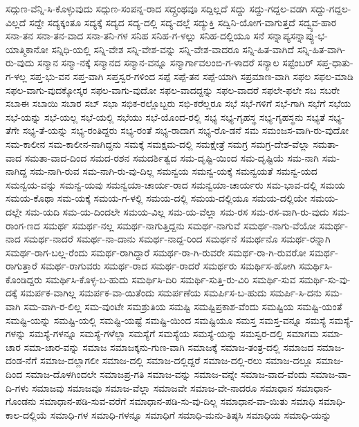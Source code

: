 ಸದ್ಗುಣ-ವೆನ್ನಿ-ಸಿ-ಕೊಳ್ಳುವುದು
ಸದ್ಗುಣ-ಸಂಪನ್ನ-ರಾದ
ಸದ್ಗ್ರಂಥವೂ
ಸದ್ದಿಲ್ಲದೆ
ಸದ್ದು
ಸದ್ದು-ಗದ್ದಲ-ವಡಗಿ
ಸದ್ದು-ಗದ್ದಲ-ವಿಲ್ಲದೆ
ಸದ್ದೇ
ಸದ್ಯಕ್ಕಂತೂ
ಸದ್ಯಕ್ಕೆ
ಸದ್ಯದ
ಸದ್ಯ-ದಲ್ಲಿ
ಸದ್ಯ-ದಲ್ಲೆ
ಸದ್ಯುಕ್ತಿ
ಸದ್ವಿನಿ-ಯೋಗ-ವಾಗುತ್ತದೆ
ಸದ್ವ್ಯವ-ಹಾರ
ಸನಾ-ತನ
ಸನಾ-ತನ-ವಾದ
ಸನಾ-ತನಿ-ಗಳ
ಸನಿಹ
ಸನಿಹ-ಗ-ಳಲ್ಲು
ಸನಿಹ-ದಲ್ಲಿಯೂ
ಸನೆ
ಸನ್ನಾಪ್ಯಸನ್ನಾಪ್ಯು-ಭ-ಯಾತ್ಮಿಕಾನೋ
ಸನ್ನಿಧಿ-ಯಲ್ಲಿ
ಸನ್ನಿ-ವೇಶ
ಸನ್ನಿ-ವೇಶ-ವನ್ನು
ಸನ್ನಿ-ವೇಶ-ವಾದರೂ
ಸನ್ನಿ-ಹಿತ-ವಾಗಿದೆ
ಸನ್ನಿ-ಹಿತ-ವಾಗಿ-ರು-ವುದು
ಸನ್ಮಾನ
ಸನ್ಮಾ-ನಕ್ಕೆ
ಸನ್ಮಾನದ
ಸನ್ಮಾನ-ವನ್ನೂ
ಸನ್ಮಾರ್ಗಾವಲಂಬಿ-ಗ-ಳಾದರೆ
ಸನ್ಯಾಲ
ಸಪ್ಟೆಂಬರ್
ಸಪ್ತ-ಧಾತು-ಗ-ಳಲ್ಲ
ಸಪ್ತ-ಭು-ವನ
ಸಪ್ತ-ವಾಗಿ
ಸಪ್ತಸ್ವರ-ಗಳಿಂದ
ಸಪ್ಪೆ
ಸಪ್ಪೆ-ತನ
ಸಪ್ಪೆ-ಯಾಗಿ
ಸಪ್ರಮಾಣ-ವಾಗಿ
ಸಫಲ
ಸಫಲ-ಮಾಡಿ
ಸಫಲ-ವಾಗು-ವುದಕ್ಕೋಸ್ಕರ
ಸಫಲ-ವಾಗು-ವುದೋ
ಸಫಲ-ವಾದದ್ದನ್ನು
ಸಫಲ-ವಾದರೆ
ಸಫಲೇ-ಫಲೇ
ಸಬ
ಸಬರೇ
ಸಬಾಈ
ಸಬಾಯಿ
ಸಬಾರ
ಸಬ್
ಸಭಾ
ಸಭಿಕ-ರಲ್ಲೊಬ್ಬರು
ಸಭಿ-ಕರೆಲ್ಲರೂ
ಸಭೆ
ಸಭೆ-ಗಳಿಗೆ
ಸಭೆ-ಗಾಗಿ
ಸಭೆಗೆ
ಸಭೆಯ
ಸಭೆ-ಯನ್ನು
ಸಭೆ-ಯಲ್ಲ
ಸಭೆ-ಯಲ್ಲಿ
ಸಭೆಯು
ಸಭೆ-ಯೊಂದ-ರಲ್ಲಿ
ಸಭ್ಯ
ಸಭ್ಯ-ಗೃಹಸ್ಥ
ಸಭ್ಯ-ಗೃಹಸ್ಥನು
ಸಭ್ಯತೆ
ಸಭ್ಯ-ತೆಗೇ
ಸಭ್ಯ-ತೆ-ಯನ್ನು
ಸಭ್ಯ-ರಂತಿದ್ದರು
ಸಭ್ಯ-ರಂತೆ
ಸಭ್ಯ-ರಾದಾಗ
ಸಭ್ಯ-ರೊ-ಡನೆ
ಸಮ
ಸಮಂಜಸ-ವಾಗಿ-ರು-ವುದೋ
ಸಮ-ಕಾಲೀನ
ಸಮ-ಕಾಲೀನ-ನಾಗಿದ್ದನು
ಸಮಕ್ಕೆ
ಸಮಕ್ಷಮ-ದಲ್ಲಿ
ಸಮಕ್ಷೇತ್ರೆ
ಸಮಗ್ರ
ಸಮಗ್ರ-ದೇಶ-ವೆಲ್ಲಾ
ಸಮತಾ-ವಾದ
ಸಮತಾ-ವಾದ-ದಿಂದ
ಸಮದ-ರಶನ
ಸಮದರ್ಶಿತ್ವದ
ಸಮ-ದೃಷ್ಟಿ-ಯಿಂದ
ಸಮ-ದೃಷ್ಟಿಯೆ
ಸಮ-ನಾಗಿ
ಸಮ-ನಾಗಿದ್ದ
ಸಮ-ನಾಗಿ-ರುವ
ಸಮ-ನಾಗಿ-ರು-ವು-ದಿಲ್ಲ
ಸಮನ್ವಯ
ಸಮನ್ವ-ಯಕ್ಕೆ
ಸಮನ್ವಯತೆ
ಸಮನ್ವ-ಯದ
ಸಮನ್ವಯ-ವನ್ನು
ಸಮನ್ವ-ಯವು
ಸಮನ್ವಯಾ-ಚಾರ್ಯ-ರಾದ
ಸಮನ್ವಯಾ-ಚಾರ್ಯರು
ಸಮ-ಭಾವ-ದಲ್ಲಿ
ಸಮಯ
ಸಮಯ-ಕೊಥಾ
ಸಮ-ಯಕ್ಕೆ
ಸಮಯ-ಗ-ಳಲ್ಲಿ
ಸಮಯ-ದಲ್ಲಿ
ಸಮಯ-ದಲ್ಲಿಯೂ
ಸಮಯ-ದಲ್ಲಿಯೇ
ಸಮಯ-ದಲ್ಲೇ
ಸಮ-ಯದಿ
ಸಮ-ಯ-ದಿಂದಲೇ
ಸಮಯ-ವಿಲ್ಲ
ಸಮ-ಯ-ವೆಲ್ಲಾ
ಸಮ-ರಸ
ಸಮ-ರಸ-ವಾಗಿ-ರು-ವುದು
ಸಮ-ರಾಂಗ-ಣದ
ಸಮರ್ಥ
ಸಮರ್ಥ-ನಲ್ಲ
ಸಮರ್ಥ-ನಾಗುತ್ತಿದ್ದನು
ಸಮರ್ಥ-ನಾಗುವೆ
ಸಮರ್ಥ-ನಾಗು-ವೆಯೋ
ಸಮರ್ಥ-ನಾದ
ಸಮರ್ಥ-ನಾದರೆ
ಸಮರ್ಥ-ನಾ-ದಾನು
ಸಮರ್ಥ-ನಾದ್ದ-ರಿಂದ
ಸಮರ್ಥನೆ
ಸಮರ್ಥನೊ
ಸಮರ್ಥ-ರನ್ನಾಗಿ
ಸಮರ್ಥ-ರಾಗ-ಬಲ್ಲ-ರೆಂದು
ಸಮರ್ಥ-ರಾಗಿದ್ದಾರೆ
ಸಮರ್ಥ-ರಾ-ಗಿ-ರುವರೇ
ಸಮರ್ಥ-ರಾ-ಗಿ-ರುವರೋ
ಸಮರ್ಥ-ರಾಗುತ್ತಾರೆ
ಸಮರ್ಥ-ರಾಗುವರು
ಸಮರ್ಥ-ರಾದ
ಸಮರ್ಥ-ರಾದರೆ
ಸಮರ್ಥರು
ಸಮರ್ಥಿಸ-ಹೋಗಿ
ಸಮರ್ಥಿಸಿ-ಕೊಂಡಿದ್ದರು
ಸಮರ್ಥಿಸಿ-ಕೊಳ್ಳ-ಬ-ಹುದು
ಸಮರ್ಥಿಸಿ-ದಿರಿ
ಸಮರ್ಥಿ-ಸುತ್ತಿ-ರು-ವಿರಿ
ಸಮರ್ಥಿ-ಸುವ
ಸಮರ್ಥಿ-ಸು-ವು-ದಕ್ಕೆ
ಸಮರ್ಪಕ-ವಾಗಿಲ್ಲ
ಸಮರ್ಪಕ-ವಾ-ಯಿತೆಂದು
ಸಮರ್ಪಣೆಯ
ಸಮರ್ಪಿಸ-ಬ-ಹುದು
ಸಮರ್ಪಿ-ಸಿ-ದನು
ಸಮ-ವಾಗಿ
ಸಮ-ವಾಗಿ-ರ-ಲಿಲ್ಲ
ಸಮ-ವುಂಟೇ
ಸಮಶ್ರುತಿಯ
ಸಮಷ್ಟಿ
ಸಮಷ್ಟಿಪ್ರಕಾಶ-ವೆಂದು
ಸಮಷ್ಟಿಯ
ಸಮಷ್ಟಿ-ಯಂತೆ
ಸಮಷ್ಟಿ-ಯನ್ನು
ಸಮಷ್ಟಿ-ಯಲ್ಲಿ
ಸಮಷ್ಟಿ-ಯಷ್ಟೆ
ಸಮಷ್ಟಿ-ಯಿಂದ
ಸಮಷ್ಟಿಯೂ
ಸಮಸ್ತ
ಸಮಸ್ತ-ವನ್ನೂ
ಸಮಸ್ಯೆ
ಸಮಸ್ಯೆ-ಗಳನ್ನು
ಸಮಸ್ಯೆ-ಗಳನ್ನೂ
ಸಮಸ್ಯೆ-ಗಳೆಲ್ಲಾ
ಸಮಸ್ಯೆಗೆ
ಸಮಸ್ಯೆಯ
ಸಮಸ್ಯೆ-ಯನ್ನು
ಸಮಸ್ವರ-ದಲ್ಲಿ
ಸಮಾಗಮ
ಸಮಾ-ಚಾರ
ಸಮಾ-ಚಾರ-ವನ್ನು
ಸಮಾಜ
ಸಮಾಜಕ್ಕನು-ಗುಣ-ವಾಗಿ
ಸಮಾಜಕ್ಕೆ
ಸಮಾಜ-ತಂತ್ರ-ದಲ್ಲಿ
ಸಮಾಜದ
ಸಮಾಜ-ದಂಡ-ನೆಗೆ
ಸಮಾಜ-ದಲ್ಲಾಗಲೀ
ಸಮಾಜ-ದಲ್ಲಿ
ಸಮಾಜ-ದಲ್ಲಿದ್ದರೆ
ಸಮಾಜ-ದಲ್ಲಿ-ರಲು
ಸಮಾಜ-ದಲ್ಲೂ
ಸಮಾಜ-ದಿಂದ
ಸಮಾಜ-ದೊಳಗಿಂದಲೇ
ಸಮಾಜಪ್ರ-ಗತಿ
ಸಮಾಜ-ವನ್ನು
ಸಮಾಜ-ವನ್ನೇ
ಸಮಾಜ-ವಾದ-ವೆಂದು
ಸಮಾಜ-ವಾ-ದಿ-ಗಳು
ಸಮಾಜವು
ಸಮಾಜವೂ
ಸಮಾಜ-ವೆಲ್ಲಾ
ಸಮಾಜವೇ
ಸಮಾಜ-ವೇ-ನಾದರೂ
ಸಮಾಧಾನ
ಸಮಾಧಾನ-ಗೊಂಡನು
ಸಮಾಧಾನ-ಪಡಿ-ಸುವ-ವರೆಗೆ
ಸಮಾಧಾನ-ಪಡಿ-ಸು-ವು-ದಿಲ್ಲ
ಸಮಾಧಾನ-ವಾ-ಯಿತು
ಸಮಾಧಿ
ಸಮಾಧಿ-ಕಾಲ-ದಲ್ಲಿಯೆ
ಸಮಾಧಿ-ಗಳ
ಸಮಾಧಿ-ಗಳನ್ನೂ
ಸಮಾಧಿಗೆ
ಸಮಾಧಿ-ಮನು-ತಿಷ್ಠಸಿ
ಸಮಾಧಿಯ
ಸಮಾಧಿ-ಯನ್ನು
